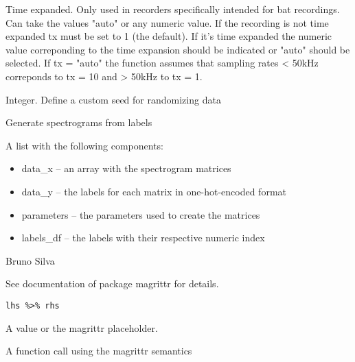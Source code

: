 \documentclass[letterpaper]{book}
\begin{document}
\begin{Arguments}
\begin{ldescription}
\item[\code{tx}] Time expanded. Only used in recorders specifically intended for
bat recordings. Can take the values "auto" or any numeric value. If the
recording is not time expanded tx must be set to 1 (the default). If it's
time expanded the numeric value correponding to the time expansion should
be indicated or "auto" should be selected. If tx = "auto" the function
assumes that sampling rates < 50kHz correponds to
tx = 10 and > 50kHz to tx = 1.

\item[\code{seed}] Integer. Define a custom seed for randomizing data
\end{ldescription}
\end{Arguments}
%
\begin{Details}\relax
Generate spectrograms from labels
\end{Details}
%
\begin{Value}
A list with the following components:
\begin{itemize}

\item{} data\_x -- an array with the spectrogram matrices
\item{} data\_y -- the labels for each matrix in one-hot-encoded format
\item{} parameters -- the parameters used to create the matrices
\item{} labels\_df -- the labels with their respective numeric index

\end{itemize}

\end{Value}
%
\begin{Author}\relax
Bruno Silva
\end{Author}
%
\begin{Description}\relax
See documentation of package magrittr for details.
\end{Description}
%
\begin{Usage}
\begin{verbatim}
lhs %>% rhs
\end{verbatim}
\end{Usage}
%
\begin{Arguments}
\begin{ldescription}
\item[\code{lhs}] A value or the magrittr placeholder.

\item[\code{rhs}] A function call using the magrittr semantics
\end{ldescription}
\end{Arguments}
\printindex{}
\end{document}
